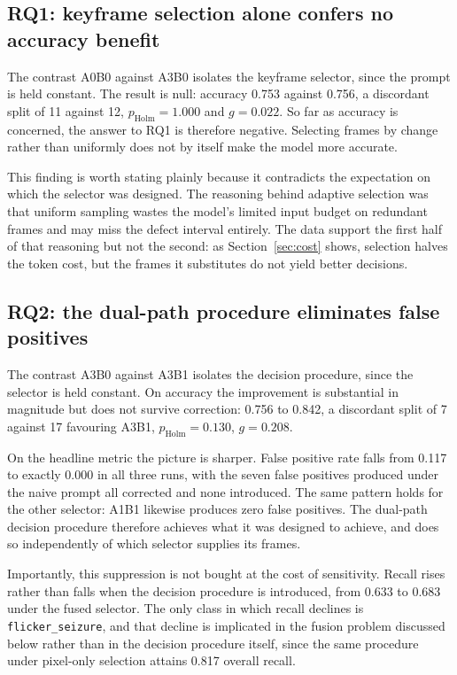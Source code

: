 \subsection{RQ1: keyframe selection alone confers no accuracy benefit}
\label{sec:attr-rq1}

The contrast A0B0 against A3B0 isolates the keyframe selector, since the
prompt is held constant. The result is null: accuracy 0.753 against 0.756,
a discordant split of 11 against 12, $p_{\text{Holm}} = 1.000$ and
$g = 0.022$. So far as accuracy is concerned, the answer to RQ1 is
therefore negative. Selecting frames by change rather than uniformly does
not by itself make the model more accurate.

This finding is worth stating plainly because it contradicts the
expectation on which the selector was designed. The reasoning behind
adaptive selection was that uniform sampling wastes the model's limited
input budget on redundant frames and may miss the defect interval
entirely. The data support the first half of that reasoning but not the
second: as Section~\ref{sec:cost} shows, selection halves the token cost,
but the frames it substitutes do not yield better decisions.

\subsection{RQ2: the dual-path procedure eliminates false positives}
\label{sec:attr-rq2}

The contrast A3B0 against A3B1 isolates the decision procedure, since the
selector is held constant. On accuracy the improvement is substantial in
magnitude but does not survive correction: 0.756 to 0.842, a discordant
split of 7 against 17 favouring A3B1, $p_{\text{Holm}} = 0.130$,
$g = 0.208$.

On the headline metric the picture is sharper. False positive rate falls
from 0.117 to exactly 0.000 in all three runs, with the seven false
positives produced under the naive prompt all corrected and none
introduced. The same pattern holds for the other selector: A1B1 likewise
produces zero false positives. The dual-path decision procedure therefore
achieves what it was designed to achieve, and does so independently of
which selector supplies its frames.

Importantly, this suppression is not bought at the cost of sensitivity.
Recall rises rather than falls when the decision procedure is introduced,
from 0.633 to 0.683 under the fused selector. The only class in which
recall declines is \texttt{flicker\_seizure}, and that decline is
implicated in the fusion problem discussed below rather than in the
decision procedure itself, since the same procedure under pixel-only
selection attains 0.817 overall recall.

